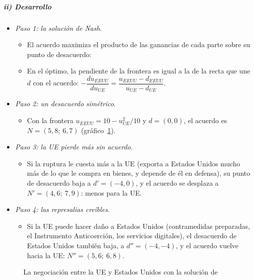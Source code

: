 \documentclass[11pt]{article}
\begin{document}
\subparagraph{ii) Desarrollo}

\begin{itemize}
\item \emph{Paso 1: la solución de Nash}.
  \begin{itemize}
  \item El acuerdo maximiza el producto de las ganancias de cada parte sobre su punto de desacuerdo:
  \item En el óptimo, la pendiente de la frontera es igual a la de la recta que une $d$ con el acuerdo: $-\dfrac{du_{\mathit{EEUU}}}{du_{\mathit{UE}}}=\dfrac{u_{\mathit{EEUU}}-d_{\mathit{EEUU}}}{u_{\mathit{UE}}-d_{\mathit{UE}}}$.
  \end{itemize}
\item \emph{Paso 2: un desacuerdo simétrico}.
  \begin{itemize}
  \item Con la frontera $u_{\mathit{EEUU}}=10-u_{\mathit{UE}}^2/10$ y $d=(0,0)$, el acuerdo es $N=(5{,}8;\ 6{,}7)$ (gráfico~\ref{fig:negociacion}).
  \end{itemize}
\item \emph{Paso 3: la UE pierde más sin acuerdo}.
  \begin{itemize}
  \item Si la ruptura le cuesta más a la UE (exporta a Estados Unidos mucho más de lo que le compra en bienes, y depende de él en defensa), su punto de desacuerdo baja a $d'=(-4,0)$, y el acuerdo se desplaza a $N'=(4{,}6;\ 7{,}9)$: menos para la UE.
  \end{itemize}
\item \emph{Paso 4: las represalias creíbles}.
  \begin{itemize}
  \item Si la UE puede hacer daño a Estados Unidos (contramedidas preparadas, el Instrumento Anticoerción, los servicios digitales), el desacuerdo de Estados Unidos también baja, a $d''=(-4,-4)$, y el acuerdo vuelve hacia la UE: $N''=(5{,}6;\ 6{,}8)$.
  \end{itemize}
\end{itemize}

\begin{figure}[H]
\centering
\caption{La negociación entre la UE y Estados Unidos con la solución de }\label{fig:negociacion}
\end{figure}
\end{document}

